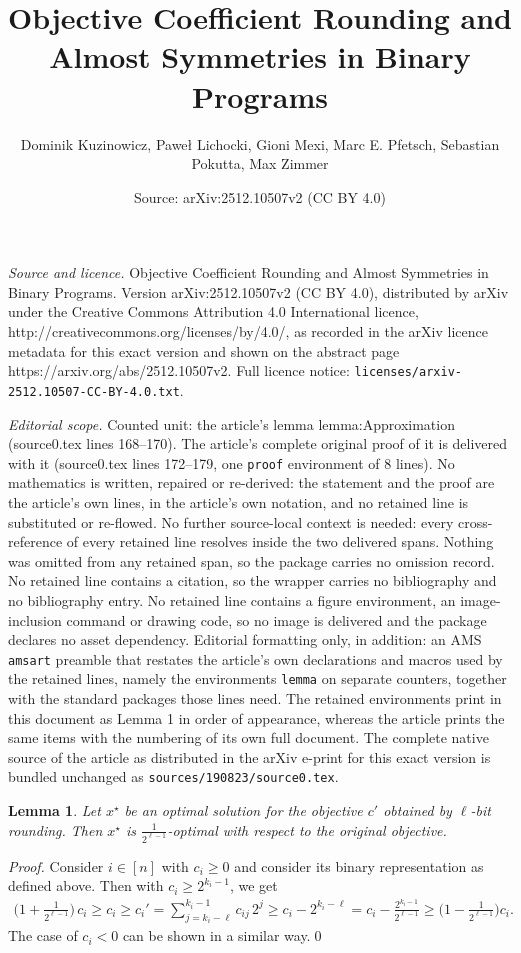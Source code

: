 \documentclass[10pt,a4paper]{amsart}
\title{Objective Coefficient Rounding and Almost Symmetries in Binary Programs}
\author{Dominik Kuzinowicz, Pawe{\l} Lichocki, Gioni Mexi, Marc E. Pfetsch, Sebastian Pokutta, Max Zimmer}
\date{Source: arXiv:2512.10507v2 (CC BY 4.0)}
\newtheorem{lemma}{Lemma}
\begin{document}
\maketitle

\noindent\emph{Source and licence.} Objective Coefficient Rounding and Almost Symmetries in Binary Programs. Version arXiv:2512.10507v2 (CC BY 4.0), distributed by arXiv under the Creative Commons Attribution 4.0 International licence, http://creativecommons.org/licenses/by/4.0/, as recorded in the arXiv licence metadata for this exact version and shown on the abstract page https://arxiv.org/abs/2512.10507v2. Full licence notice: \texttt{licenses/arxiv-2512.10507-CC-BY-4.0.txt}.\par\smallskip

\noindent\textit{Editorial scope.} Counted unit: the article's lemma lemma:Approximation (source0.tex lines 168--170). The article's complete original proof of it is delivered with it (source0.tex lines 172--179, one \texttt{proof} environment of 8 lines). No mathematics is written, repaired or re-derived: the statement and the proof are the article's own lines, in the article's own notation, and no retained line is substituted or re-flowed.  No further source-local context is needed: every cross-reference of every retained line resolves inside the two delivered spans.  Nothing was omitted from any retained span, so the package carries no omission record.  No retained line contains a citation, so the wrapper carries no bibliography and no bibliography entry.  No retained line contains a figure environment, an image-inclusion command or drawing code, so no image is delivered and the package declares no asset dependency.  Editorial formatting only, in addition: an AMS \texttt{amsart} preamble that restates the article's own declarations and macros used by the retained lines, namely the environments \texttt{lemma} on separate counters, together with the standard packages those lines need.  The retained environments print in this document as Lemma 1 in order of appearance, whereas the article prints the same items with the numbering of its own full document.  The complete native source of the article as distributed in the arXiv e-print for this exact version is bundled unchanged as \texttt{sources/190823/source0.tex}.
\begin{lemma}\label{lemma:Approximation}
   Let $x^\star$ be an optimal solution for the objective $c'$ obtained by $\ell$-bit rounding. Then $x^\star$ is $\frac{1}{2^{\ell-1}}$-optimal with respect to the original objective.
\end{lemma}

\begin{proof}
    Consider $i \in [n]$ with $c_i \geq 0$ and consider its binary representation as defined above.
    Then with $c_i \geq 2^{k_i-1}$, we get
    \begin{align*}
    \big(1+ \tfrac{1}{2^{\ell-1}}\big)\, c_i \geq c_i \geq c_i' = \sum_{j = k_i - \ell}^{k_i - 1} c_{ij}\, 2^j \geq c_i - 2^{k_i-\ell} = c_i - \frac{2^{k_i-1}}{2^{\ell-1}} \geq \big(1- \tfrac{1}{2^{\ell-1}}\big) c_i.
    \end{align*}
    The case of $c_i < 0$ can be shown in a similar way.\qed
\end{proof}
\end{document}
